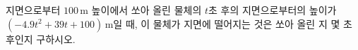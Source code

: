 지면으로부터 $100\,\mathrm{m}$ 높이에서 쏘아 올린 물체의 $t$초 후의 지면으로부터의 높이가 $(-4.9t^2+39t+100)\,\mathrm{m}$일 때, 이 물체가 지면에 떨어지는 것은 쏘아 올린 지 몇 초 후인지 구하시오.

